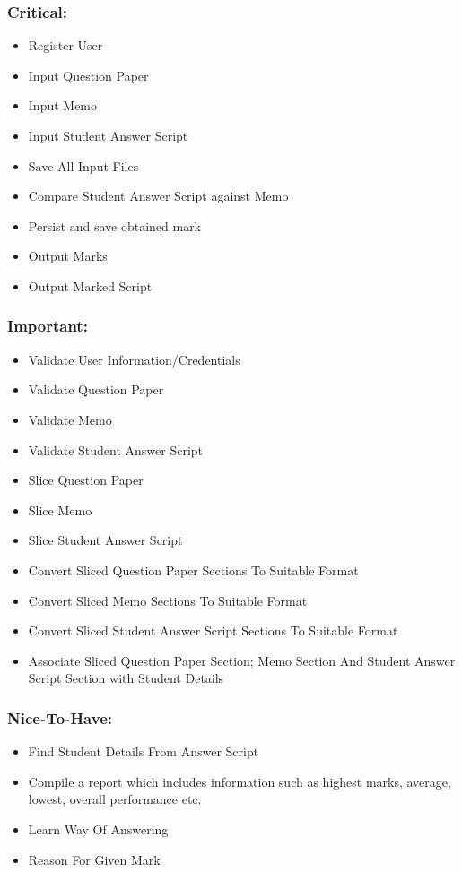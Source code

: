 \documentclass{article}
\begin{document}
		\subsubsection{Critical:}
			\begin{itemize}
				\item Register User
				\item Input Question Paper
				\item Input Memo
				\item Input Student Answer Script
				\item Save All Input Files
				\item Compare Student Answer Script against Memo
				\item Persist and save obtained mark
				\item Output Marks
				\item Output Marked Script
			\end{itemize}
		\subsubsection{Important:}
			\begin{itemize}
				\item Validate User Information/Credentials
				\item Validate Question Paper
				\item Validate Memo
				\item Validate Student Answer Script
				\item Slice Question Paper
				\item Slice Memo
				\item Slice Student Answer Script
				\item Convert Sliced Question Paper Sections To Suitable Format
				\item Convert Sliced Memo Sections To Suitable Format
				\item Convert Sliced Student Answer Script Sections To Suitable Format
				\item Associate Sliced Question Paper Section; Memo Section And Student Answer Script Section with Student Details
				
			\end{itemize}
		\subsubsection{Nice-To-Have:}
			\begin{itemize}
				\item Find Student Details From Answer Script
				\item Compile a report which includes information such as highest marks, average, lowest, overall performance etc.
				\item Learn Way Of Answering
				\item Reason For Given Mark
			
			\end{itemize}
\end{document}
